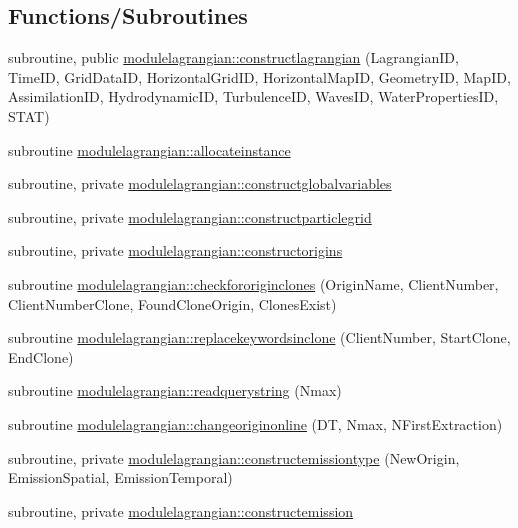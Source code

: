 \subsection*{Functions/\+Subroutines}
\begin{DoxyCompactItemize}
\item 
subroutine, public \mbox{\hyperlink{namespacemodulelagrangian_ad766e71e7390a14dd30513d8ec8ca115}{modulelagrangian\+::constructlagrangian}} (Lagrangian\+ID, Time\+ID, Grid\+Data\+ID, Horizontal\+Grid\+ID, Horizontal\+Map\+ID, Geometry\+ID, Map\+ID, Assimilation\+ID, Hydrodynamic\+ID, Turbulence\+ID, Waves\+ID, Water\+Properties\+ID, S\+T\+AT)
\item 
subroutine \mbox{\hyperlink{namespacemodulelagrangian_a8223a77ae9396e4ded8f6f220eb1ebe0}{modulelagrangian\+::allocateinstance}}
\item 
subroutine, private \mbox{\hyperlink{namespacemodulelagrangian_aadb63f9fca438cc41d82d25d4e841aa6}{modulelagrangian\+::constructglobalvariables}}
\item 
subroutine, private \mbox{\hyperlink{namespacemodulelagrangian_a190cd84669e94eedbb0ca723a973969c}{modulelagrangian\+::constructparticlegrid}}
\item 
subroutine, private \mbox{\hyperlink{namespacemodulelagrangian_a18d4f1108b3f7cc2ab468c5271bc2a42}{modulelagrangian\+::constructorigins}}
\item 
subroutine \mbox{\hyperlink{namespacemodulelagrangian_a80725dbaa881f5358592ca2d92316001}{modulelagrangian\+::checkfororiginclones}} (Origin\+Name, Client\+Number, Client\+Number\+Clone, Found\+Clone\+Origin, Clones\+Exist)
\item 
subroutine \mbox{\hyperlink{namespacemodulelagrangian_a6f0ed297af020601a6d8ac70faef5cae}{modulelagrangian\+::replacekeywordsinclone}} (Client\+Number, Start\+Clone, End\+Clone)
\item 
subroutine \mbox{\hyperlink{namespacemodulelagrangian_a1d47ba91199ceabdf0bbe9cc584783b7}{modulelagrangian\+::readquerystring}} (Nmax)
\item 
subroutine \mbox{\hyperlink{namespacemodulelagrangian_abfb29437c427b37d5253837c1d2b738e}{modulelagrangian\+::changeoriginonline}} (DT, Nmax, N\+First\+Extraction)
\item 
subroutine, private \mbox{\hyperlink{namespacemodulelagrangian_a647212013ee98b692308121cf19b0e90}{modulelagrangian\+::constructemissiontype}} (New\+Origin, Emission\+Spatial, Emission\+Temporal)
\item 
subroutine, private \mbox{\hyperlink{namespacemodulelagrangian_ac0e529585f9aa6d77944f42eec49c399}{modulelagrangian\+::constructemission}}

\end{DoxyCompactItemize}
